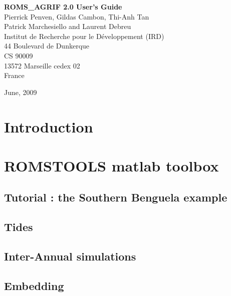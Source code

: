\documentclass[11pt]{book}
\begin{document}
\pagestyle{empty}
\begin{center}
\vspace{3 cm}
{\huge \bf ROMS\_AGRIF 2.0 User's Guide }\\
\vspace{2 cm}
{\Large Pierrick Penven, Gildas Cambon, Thi-Anh Tan \\ 
Patrick Marchesiello and Laurent Debreu}\\ 
\vspace{1 cm}
{\Large Institut de Recherche pour le D\'eveloppement (IRD)}\\
\vspace{0.5 cm}
{\large 44 Boulevard de Dunkerque} \\
{\large CS 90009} \\
{\large 13572 Marseille cedex 02} \\
{\Large France} \\
\vspace{2cm}
\centerline{}
\vspace{1cm}
{June, 2009}
\end{center}

\chapter*{Introduction}

\newpage
\tableofcontents
\newpage
\chapter{ROMSTOOLS matlab toolbox}





\section{Tutorial : the Southern Benguela example}


\section{Tides}


\section{Inter-Annual simulations}


\section{Embedding}

\end{document}
